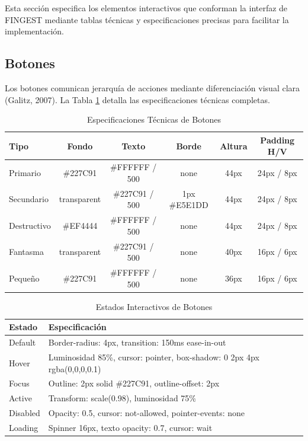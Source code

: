 \documentclass[12pt,a4paper,oneside]{article}
\begin{document}
Esta sección especifica los elementos interactivos que conforman la interfaz de FINGEST mediante tablas técnicas y especificaciones precisas para facilitar la implementación.

\subsection{Botones}

Los botones comunican jerarquía de acciones mediante diferenciación visual clara (Galitz, 2007). La Tabla \ref{tab:botones-specs} detalla las especificaciones técnicas completas.

\begin{table}[h]
\centering
\caption{Especificaciones Técnicas de Botones}
\label{tab:botones-specs}
\small
\begin{tabular}{|l|c|c|c|c|c|}
\hline
\textbf{Tipo} & \textbf{Fondo} & \textbf{Texto} & \textbf{Borde} & \textbf{Altura} & \textbf{Padding H/V} \\
\hline
Primario & \#227C91 & \#FFFFFF / 500 & none & 44px & 24px / 8px \\
\hline
Secundario & transparent & \#227C91 / 500 & 1px \#E5E1DD & 44px & 24px / 8px \\
\hline
Destructivo & \#EF4444 & \#FFFFFF / 500 & none & 44px & 24px / 8px \\
\hline
Fantasma & transparent & \#227C91 / 500 & none & 40px & 16px / 6px \\
\hline
Pequeño & \#227C91 & \#FFFFFF / 500 & none & 36px & 16px / 6px \\
\hline
\end{tabular}
\end{table}

\begin{table}[h]
\centering
\caption{Estados Interactivos de Botones}
\label{tab:botones-estados}
\small
\begin{tabular}{|l|p{10cm}|}
\hline
\textbf{Estado} & \textbf{Especificación} \\
\hline
Default & Border-radius: 4px, transition: 150ms ease-in-out \\
\hline
Hover & Luminosidad 85\%, cursor: pointer, box-shadow: 0 2px 4px rgba(0,0,0,0.1) \\
\hline
Focus & Outline: 2px solid \#227C91, outline-offset: 2px \\
\hline
Active & Transform: scale(0.98), luminosidad 75\% \\
\hline
Disabled & Opacity: 0.5, cursor: not-allowed, pointer-events: none \\
\hline
Loading & Spinner 16px, texto opacity: 0.7, cursor: wait \\
\hline
\end{tabular}
\end{table}
\end{document}
